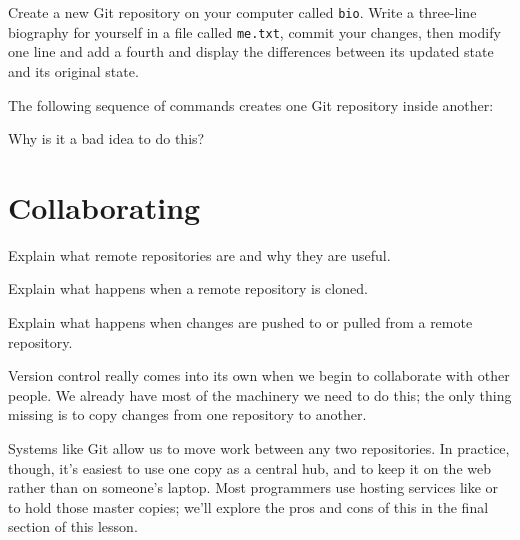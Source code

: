 \begin{challenge}
  Create a new Git repository on your computer called \texttt{bio}.
  Write a three-line biography for yourself in a file called
  \texttt{me.txt}, commit your changes, then modify one line and add a
  fourth and display the differences between its updated state and its
  original state.
\end{challenge}

\begin{challenge}
  The following sequence of commands creates one Git repository inside
  another:


  Why is it a bad idea to do this?
\end{challenge}

\section{Collaborating}

\begin{objectives}
\begin{swcitemize}
\item
  Explain what remote repositories are and why they are useful.
\item
  Explain what happens when a remote repository is cloned.
\item
  Explain what happens when changes are pushed to or pulled from a
  remote repository.
\end{swcitemize}
\end{objectives}

Version control really comes into its own when we begin to collaborate
with other people. We already have most of the machinery we need to do
this; the only thing missing is to copy changes from one repository to
another.

Systems like Git allow us to move work between any two repositories. In
practice, though, it's easiest to use one copy as a central hub, and to
keep it on the web rather than on someone's laptop. Most programmers use
hosting services like  or
 to hold those master copies;
we'll explore the pros and cons of this in the final section of this
lesson.

